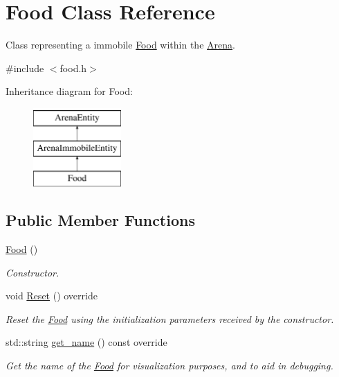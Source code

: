 \hypertarget{class_food}{}\section{Food Class Reference}
\label{class_food}


Class representing a immobile \hyperlink{class_food}{Food} within the \hyperlink{class_arena}{Arena}.  




{\ttfamily \#include $<$food.\+h$>$}

Inheritance diagram for Food\+:\begin{figure}[H]
\begin{center}
\leavevmode
\includegraphics[height=3.000000cm]{class_food}
\end{center}
\end{figure}
\subsection*{Public Member Functions}
\begin{DoxyCompactItemize}
\item 
\hyperlink{class_food_a75d4d7f76fd495cc8133302ca9fdc485}{Food} ()
\begin{DoxyCompactList}\small\item\em Constructor. \end{DoxyCompactList}\item 
void \hyperlink{class_food_a1a12bfd50400e04b595c24a512317c1a}{Reset} () override\hypertarget{class_food_a1a12bfd50400e04b595c24a512317c1a}{}\label{class_food_a1a12bfd50400e04b595c24a512317c1a}

\begin{DoxyCompactList}\small\item\em Reset the \hyperlink{class_food}{Food} using the initialization parameters received by the constructor. \end{DoxyCompactList}\item 
std\+::string \hyperlink{class_food_a5c3bcd5109750a15ebb24b8a2a3cdd07}{get\+\_\+name} () const override
\begin{DoxyCompactList}\small\item\em Get the name of the \hyperlink{class_food}{Food} for visualization purposes, and to aid in debugging. \end{DoxyCompactList}\end{DoxyCompactItemize}


